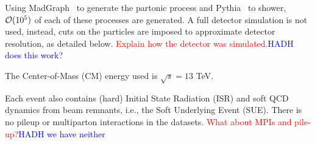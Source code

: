     Using MadGraph~\cite{alwall_madgraph2011} to generate the partonic process and Pythia~\cite{sjostrand_pythia2015} to shower, ${\cal O}(10^5)$ of each of these processes are generated.
    A full detector simulation is not used, instead, cuts on the particles are imposed to approximate detector resolution, as detailed below. 
    {\textcolor{red}{Explain how the detector was simulated.}\textcolor{blue}{HADH does this work?}}
    
    The Center-of-Mass (CM) energy used is \(\sqrt{s}=13 \) TeV.

    Each event also contains (hard) Initial State Radiation (ISR) and soft QCD dynamics from beam remnants, i.e., the Soft Underlying Event (SUE).
    There is no pileup or multiparton interactions in the datasets.
    {\textcolor{red}{What about MPIs and pile-up?}\textcolor{blue}{HADH we have neither}}

